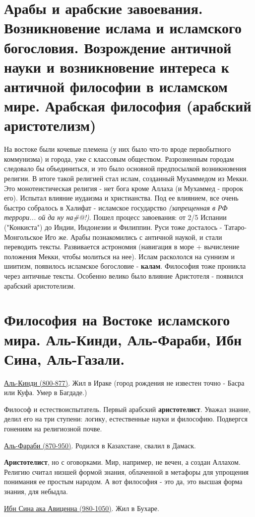 \documentclass[12pt,a4paper]{article}
\begin{document}
\section{Арабы и арабские завоевания. Возникновение ислама и исламского богословия. Возрождение античной науки и возникновение интереса к античной философии в исламском мире. Арабская философия (арабский аристотелизм)}
На востоке были кочевые племена (у них было что-то вроде первобытного коммунизма) и города, уже с классовым обществом.
Разрозненным городам следовало бы объединиться, и это было основной предпосылкой возникновения религии. В итоге такой религией стал ислам, созданный Мухаммедом из Мекки. Это монотеистическая религия - нет бога кроме Аллаха (и Мухаммед - пророк его). Испытал влияние иудаизма и христианства. Под ее влиянием, все очень быстро собралось в Халифат - исламское государство \textit{(запрещенная в РФ террори... ой да ну на\#@!)}. Пошел процесс завоевания: от 2/5 Испании ("Конкиста") до Индии, Индонезии и Филиппин. Руси тоже досталось - Татаро-Монгольское Иго же. Арабы познакомились с античной наукой, и стали переводить тексты. Развивается астрономия (навигация в море + вычисление положения Мекки, чтобы молиться на нее). Ислам раскололся на суннизм и шиитизм, появилось исламское богословие - \textbf{калам}. Философия тоже проникла через античные тексты. Особенно велико было влияние Аристотеля - появился арабский аристотелизм.

\section{Философия на Востоке исламского мира. Аль-Кинди, Аль-Фараби, Ибн Сина, Аль-Газали.}

\underline{Аль-Кинди (800-877)}. Жил в Ираке (город рождения не известен точно - Басра или Куфа. Умер в Багдаде.)

Философ и естествоиспытатель. Первый арабский \textbf{аристотелист}. Уважал знание, делил его на три ступени: логику, естественные науки и философию. Подвергся гонениям на религиозной почве.

\underline{Аль-Фараби (870-950)}. Родился в Казахстане, свалил в Дамаск.

\textbf{Аристотелист}, но с оговорками. Мир, например, не вечен, а создан Аллахом. Религию считал низшей формой знания, облаченной в метафоры для упрощения понимания ее простым народом. А вот философия - это да, это высшая форма знания, для небыдла.

\underline{Ибн Сина ака Авиценна (980-1050)}. Жил в Бухаре.
\end{document}
